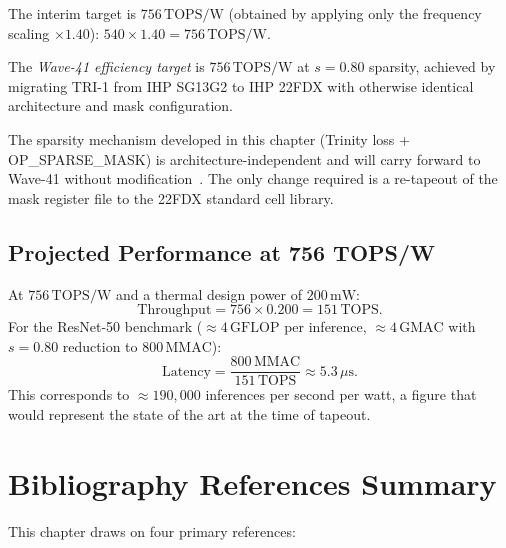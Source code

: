 The interim target is $756\,\mathrm{TOPS/W}$ (obtained by applying only the
frequency scaling $\times 1.40$):
$540 \times 1.40 = 756\,\mathrm{TOPS/W}$.

\begin{definition}
\label{def:wave41-target}
The \emph{Wave-41 efficiency target} is $756\,\mathrm{TOPS/W}$ at $s=0.80$
sparsity, achieved by migrating TRI-1 from IHP SG13G2 to IHP 22FDX with
otherwise identical architecture and mask configuration.
\end{definition}

The sparsity mechanism developed in this chapter (Trinity loss + OP\_SPARSE\_MASK)
is architecture-independent and will carry forward to Wave-41 without
modification~\cite{blalock2020state}.  The only change required is a re-tapeout
of the mask register file to the 22FDX standard cell library.

\subsection{Projected Performance at 756 TOPS/W}
\label{subsec:wave41-perf}

At $756\,\mathrm{TOPS/W}$ and a thermal design power of $200\,\mathrm{mW}$:
\[
  \mathrm{Throughput} = 756 \times 0.200 = 151\,\mathrm{TOPS}.
\]
For the ResNet-50 benchmark ($\approx 4\,\mathrm{GFLOP}$ per inference,
$\approx 4\,\mathrm{GMAC}$ with $s=0.80$ reduction to $800\,\mathrm{MMAC}$):
\[
  \mathrm{Latency} = \frac{800\,\mathrm{MMAC}}{151\,\mathrm{TOPS}} \approx 5.3\,\mu\mathrm{s}.
\]
This corresponds to $\approx 190{,}000$ inferences per second per watt, a
figure that would represent the state of the art at the time of tapeout.


\section{Bibliography References Summary}
\label{sec:bib-summary}

This chapter draws on four primary references:

